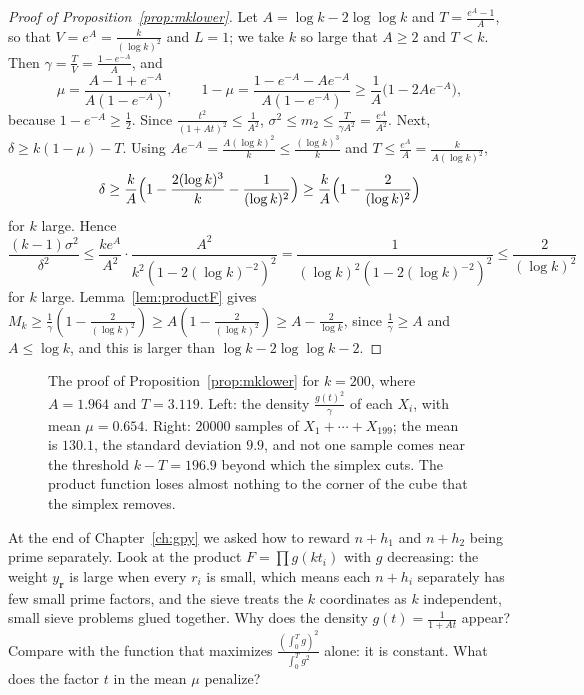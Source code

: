 \begin{proof}[Proof of Proposition~\ref{prop:mklower}]
Let $A=\log k-2\log\log k$ and $T=\frac{e^A-1}A$, so that $V=e^A=\frac k{(\log k)^2}$ and $L=1$; we take $k$ so large that $A\ge2$ and $T<k$. Then $\gamma=\frac TV=\frac{1-e^{-A}}A$, and
\[
\mu=\frac{A-1+e^{-A}}{A(1-e^{-A})},\qquad1-\mu=\frac{1-e^{-A}-Ae^{-A}}{A(1-e^{-A})}\ge\frac1A\bigl(1-2Ae^{-A}\bigr),
\]
because $1-e^{-A}\ge\frac12$. Since $\frac{t^2}{(1+At)^2}\le\frac1{A^2}$, $\sigma^2\le m_2\le\frac T{\gamma A^2}=\frac{e^A}{A^2}$. Next, $\delta\ge k(1-\mu)-T$. Using $Ae^{-A}=\frac{A(\log k)^2}k\le\frac{(\log k)^3}k$ and $T\le\frac{e^A}A=\frac k{A(\log k)^2}$,
\[
\delta\ge\frac kA\Bigl(1-\frac{2(\log k)^3}k-\frac1{(\log k)^2}\Bigr)\ge\frac kA\Bigl(1-\frac2{(\log k)^2}\Bigr)
\]
for $k$ large. Hence
\[
\frac{(k-1)\sigma^2}{\delta^2}\le\frac{ke^A}{A^2}\cdot\frac{A^2}{k^2(1-2(\log k)^{-2})^2}=\frac1{(\log k)^2(1-2(\log k)^{-2})^2}\le\frac2{(\log k)^2}
\]
for $k$ large. Lemma~\ref{lem:productF} gives $M_k\ge\frac1\gamma(1-\frac2{(\log k)^2})\ge A(1-\frac2{(\log k)^2})\ge A-\frac2{\log k}$, since $\frac1\gamma\ge A$ and $A\le\log k$, and this is larger than $\log k-2\log\log k-2$.
\end{proof}

\begin{figure}[ht]
\centering
{}
\caption{The proof of Proposition~\ref{prop:mklower} for $k=200$, where $A=1.964$ and $T=3.119$. Left: the density $\frac{g(t)^2}\gamma$ of each $X_i$, with mean $\mu=0.654$. Right: $20000$ samples of $X_1+\cdots+X_{199}$; the mean is $130.1$, the standard deviation $9.9$, and not one sample comes near the threshold $k-T=196.9$ beyond which the simplex cuts. The product function loses almost nothing to the corner of the cube that the simplex removes.}
\label{fig:chance}
\end{figure}

\begin{think}
At the end of Chapter~\ref{ch:gpy} we asked how to reward $n+h_1$ and $n+h_2$ being prime separately. Look at the product $F=\prod g(kt_i)$ with $g$ decreasing: the weight $y_{\mathbf r}$ is large when every $r_i$ is small, which means each $n+h_i$ separately has few small prime factors, and the sieve treats the $k$ coordinates as $k$ independent, small sieve problems glued together. Why does the density $g(t)=\frac1{1+At}$ appear? Compare with the function that maximizes $\frac{(\int_0^Tg)^2}{\int_0^Tg^2}$ alone: it is constant. What does the factor $t$ in the mean $\mu$ penalize?
\end{think}

